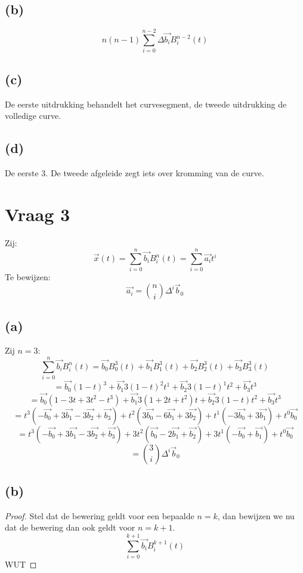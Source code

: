 \documentclass[10pt,a4paper]{article}
\begin{document}
\subsection*{(b)}
\[
n(n-1)
\sum_{i=0}^{n-2}\Delta\vec{b_{i}}B^{n-2}_{i}(t)
\]

\subsection*{(c)}
De eerste uitdrukking behandelt het curvesegment, de tweede uitdrukking de volledige curve.


\subsection*{(d)}
De eerste 3. De tweede afgeleide zegt iets over kromming van de curve.

\section{Vraag 3}
Zij:
\[
\vec{x}(t) = \sum_{i=0}^{n}\vec{b_{i}}B^{n}_{i}(t) = \sum_{i=0}^{n}\vec{a_{i}}t^i
\]
Te bewijzen:
\[
\vec{a_i} = \binom{n}{i}\Delta^i\vec{b}_0
\]
\subsection*{(a)}
Zij $n=3$:
\[
\sum_{i=0}^{n}\vec{b_{i}}B^{n}_{i}(t)
= \vec{b_{0}}B^{3}_{0}(t)
+ \vec{b_{1}}B^{3}_{1}(t)
+ \vec{b_{2}}B^{3}_{2}(t)
+ \vec{b_{3}}B^{3}_{3}(t)
\]
\[
= \vec{b_{0}}(1-t)^{3}
+ \vec{b_{1}}3(1-t)^{2}t^{1}
+ \vec{b_{2}}3(1-t)^{1}t^{2}
+ \vec{b_{3}}t^{3}
\]
\[
= \vec{b_{0}}(1-3t+3t^2-t^3)
+ \vec{b_{1}}3(1+2t+t^2)t
+ \vec{b_{2}}3(1-t)t^{2}
+ \vec{b_{3}}t^{3}
\]
\[
= t^3(- \vec{b_0}+3\vec{b_1}-3\vec{b_2}+\vec{b_3})
+ t^2( 3\vec{b_0}-6\vec{b_1}+3\vec{b_2})
+ t^1(-3\vec{b_0}+3\vec{b_1})
+ t^0   \vec{b_0}
\]
\[
=  t^3(-\vec{b_0}+3\vec{b_1}-3\vec{b_2}+\vec{b_3})
+ 3t^2( \vec{b_0}-2\vec{b_1}+ \vec{b_2})
+ 3t^1(-\vec{b_0}+ \vec{b_1})
+  t^0  \vec{b_0}
\]
\[
= \binom{3}{i}\Delta^i\vec{b}_0
\]

\subsection*{(b)}
\begin{proof}
Stel dat de bewering geldt voor een bepaalde $n=k$, dan bewijzen we nu dat de bewering dan ook geldt voor $n=k+1$.
\[
\sum_{i=0}^{k+1}\vec{b_{i}}B^{k+1}_{i}(t)
\]
WUT
\end{proof}
\end{document}
